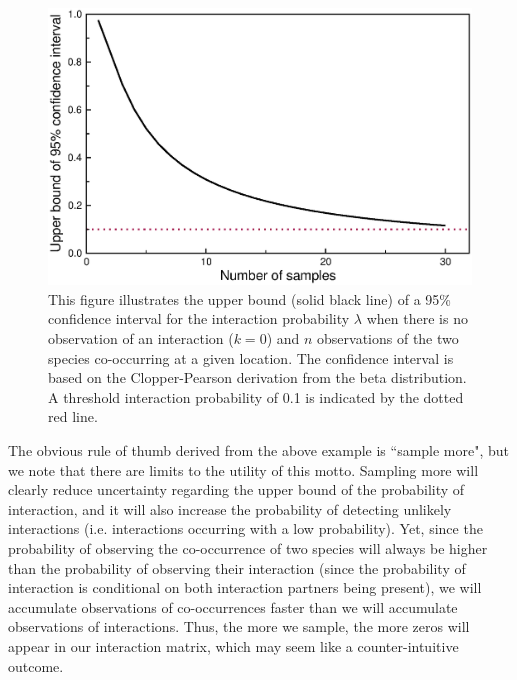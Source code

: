 \documentclass[12pt]{article}
\begin{document}
  \begin{figure}
    \caption{This figure illustrates the upper bound (solid black line) of a 95\% confidence interval for the interaction probability $\lambda$ when there is no observation of an interaction ($k = 0$) and $n$ observations of the two species co-occurring at a given location. The confidence interval is based on the Clopper-Pearson derivation from the beta distribution. A threshold interaction probability of 0.1 is indicated by the dotted red line.}
    \label{upper_limits}
    \includegraphics*[width=.8\textwidth]{figures/upper_limit_DG.eps}
  \end{figure}


  The obvious rule of thumb derived from the above example is ``sample more", but we note that there are limits to the utility of this motto. Sampling more will clearly reduce uncertainty regarding the upper bound of the probability of interaction, and it will also increase the probability of detecting unlikely interactions (i.e. interactions occurring with a low probability). Yet, since the probability of observing the co-occurrence of two species will always be higher than the probability of observing their interaction (since the probability of interaction is conditional on both interaction partners being present), we will accumulate observations of co-occurrences faster than we will accumulate observations of interactions. Thus, the more we sample, the more zeros will appear in our interaction matrix, which may seem like a counter-intuitive outcome. 
\end{document}
